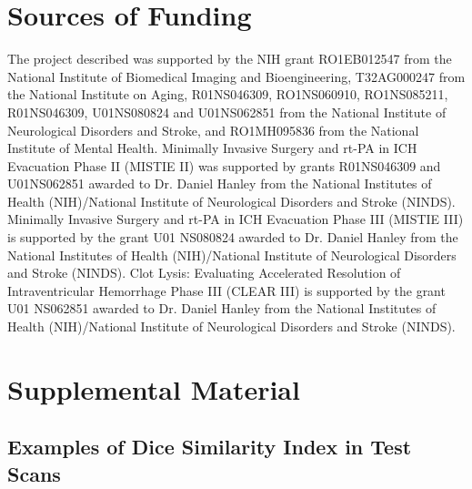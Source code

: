 \documentclass{elsarticle_nonatbib}\usepackage[]{graphicx}\usepackage[]{color}
\begin{document}
\section*{Sources of Funding}
The project described was supported by the NIH grant RO1EB012547 from the National Institute of Biomedical Imaging and Bioengineering, T32AG000247 from the National Institute on Aging, R01NS046309, RO1NS060910, RO1NS085211, R01NS046309, U01NS080824 and U01NS062851 from the National Institute of Neurological Disorders and Stroke, and RO1MH095836 from the National Institute of Mental Health. Minimally Invasive Surgery and rt-PA in ICH Evacuation Phase II (MISTIE II) was supported by grants R01NS046309 and U01NS062851 awarded to Dr. Daniel Hanley from the National Institutes of Health (NIH)/National Institute of Neurological Disorders and Stroke (NINDS).  Minimally Invasive Surgery and rt-PA in ICH Evacuation Phase III (MISTIE III) is supported by the grant U01 NS080824 awarded to Dr. Daniel Hanley from the National Institutes of Health (NIH)/National Institute of Neurological Disorders and Stroke (NINDS). Clot Lysis: Evaluating Accelerated Resolution of Intraventricular Hemorrhage Phase III (CLEAR III) is supported by the grant U01 NS062851 awarded to Dr. Daniel Hanley from the National Institutes of Health (NIH)/National Institute of Neurological Disorders and Stroke (NINDS).

\newpage
%
%
%
\printbibliography

\clearpage
\section{Supplemental Material}

\subsection{Examples of Dice Similarity Index in Test Scans}
\end{document}
